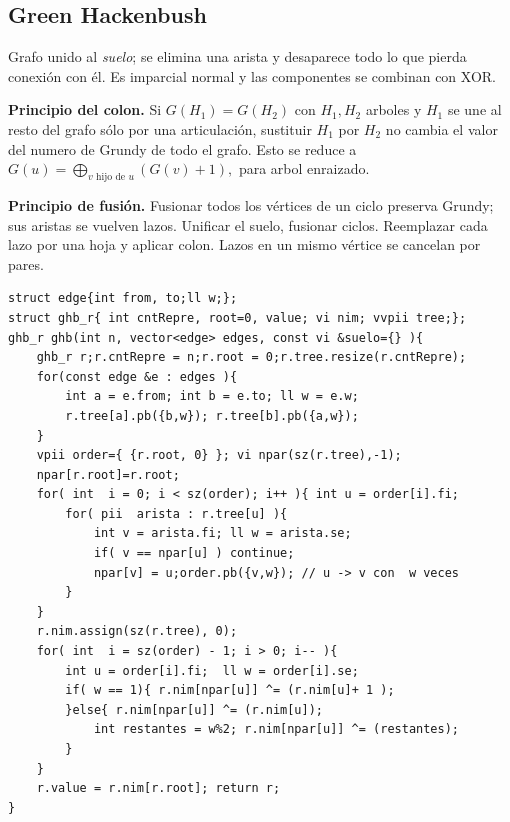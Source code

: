 \subsection{Green Hackenbush}
Grafo unido al \textit{suelo}; se elimina una arista y desaparece todo lo que pierda conexión con él. Es imparcial normal y las componentes se combinan con XOR.

\textbf{Principio del colon.} Si $G(H_1)=G(H_2)$ con $H_1,H_2$ arboles y  $H_1$ se une al resto del grafo sólo por una articulación, sustituir $H_1$ por $H_2$ no cambia el valor del numero de Grundy de todo el grafo. Esto se reduce a 
$
G(u)=\bigoplus_{v\text{ hijo de }u}(G(v)+1),
$
para arbol enraizado.

\textbf{Principio de fusión.} Fusionar todos los vértices de un ciclo preserva Grundy; sus aristas se vuelven lazos. Unificar el suelo, fusionar ciclos. Reemplazar cada lazo por una hoja y aplicar colon. Lazos en un mismo vértice se cancelan por pares.\\

\algoinfo{ (N+M) \alpha(N) }{ N+M }{Nodos en $[0,N)$. Grafo general}





\ifextendedversion
{}
\begin{verbatim}
struct edge{int from, to;ll w;};
struct ghb_r{ int cntRepre, root=0, value; vi nim; vvpii tree;};
ghb_r ghb(int n, vector<edge> edges, const vi &suelo={} ){
    ghb_r r;r.cntRepre = n;r.root = 0;r.tree.resize(r.cntRepre);
    for(const edge &e : edges ){
        int a = e.from; int b = e.to; ll w = e.w;
        r.tree[a].pb({b,w}); r.tree[b].pb({a,w}); 
    }
    vpii order={ {r.root, 0} }; vi npar(sz(r.tree),-1);
    npar[r.root]=r.root;
    for( int  i = 0; i < sz(order); i++ ){ int u = order[i].fi;
        for( pii  arista : r.tree[u] ){ 
            int v = arista.fi; ll w = arista.se;
            if( v == npar[u] ) continue;
            npar[v] = u;order.pb({v,w}); // u -> v con  w veces
        }
    }
    r.nim.assign(sz(r.tree), 0);
    for( int  i = sz(order) - 1; i > 0; i-- ){
        int u = order[i].fi;  ll w = order[i].se; 
        if( w == 1){ r.nim[npar[u]] ^= (r.nim[u]+ 1 ); 
        }else{ r.nim[npar[u]] ^= (r.nim[u]);
            int restantes = w%2; r.nim[npar[u]] ^= (restantes);
        }      
    }
    r.value = r.nim[r.root]; return r;
}
\end{verbatim}
\fi